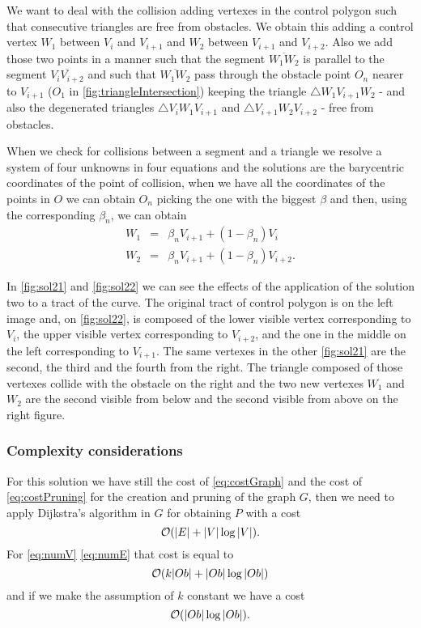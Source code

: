 \documentclass[dissertation.tex]{subfiles}
\begin{document}
We want to deal with the collision adding vertexes in the control
polygon such that consecutive triangles are free from obstacles. We
obtain this adding a control vertex $W_1$ between $V_i$ and $V_{i+1}$
and $W_2$ between $V_{i+1}$ and $V_{i+2}$. Also we add those two
points in a manner such that the segment $\overline{W_1W_2}$ is
parallel to the segment $\overline{V_iV_{i+2}}$ and such that
$\overline{W_1W_2}$ pass through the obstacle point $O_n$ nearer to
$V_{i+1}$ ($O_1$ in \cref{fig:triangleIntersection}) keeping the
triangle $\triangle W_1V_{i+1}W_2$ - and also
the degenerated triangles $\triangle V_iW_1V_{i+1}$ and $\triangle
V_{i+1}W_2V_{i+2}$ - free from obstacles.

When we check for collisions between a segment and a triangle we
resolve a system of four unknowns in
four equations and the solutions are the barycentric coordinates of
the point of collision, when we have all the coordinates of the points
in $O$ we can obtain $O_n$ picking the one with the biggest $\beta$
and then, using the corresponding $\beta_n$, we can obtain
\begin{eqnarray*}
  W_1&=&\beta_n V_{i+1}+(1-\beta_n)V_i\\
  W_2&=&\beta_n V_{i+1}+(1-\beta_n)V_{i+2}.
\end{eqnarray*}

In \cref{fig:sol21} and \cref{fig:sol22} we can see the effects of the
application of the
solution two to a tract of the curve. The original tract of control
polygon is on the left image and, on \cref{fig:sol22}, is composed of
the lower
visible vertex corresponding to $V_i$, the
upper visible vertex corresponding to $V_{i+2}$, and the one in
the middle on the left corresponding to $V_{i+1}$. The same vertexes
in the other \cref{fig:sol21} are the second, the third and the fourth
from the right. The triangle
composed of those vertexes
collide with the obstacle on the right and the two new vertexes $W_1$
and $W_2$ are the second visible from below and the second visible
from above on the right figure.

\subsubsection{Complexity considerations}
For this solution we have still the cost of \cref{eq:costGraph} and
the cost of \cref{eq:costPruning} for
the creation and pruning of the graph $G$, then we need to apply Dijkstra's
algorithm in $G$ for obtaining $P$ with a cost
\begin{equation*}
  \mathcal{O}(|E|+|V|\log |V|).
\end{equation*}
For \cref{eq:numV} \cref{eq:numE} that cost is equal to
\begin{equation*}
  \mathcal{O}(k|Ob|+|Ob|\log |Ob|)
\end{equation*}
and if we make the assumption of $k$ constant we have a cost
\begin{equation*}
  \mathcal{O}(|Ob|\log |Ob|).
\end{equation*}
\end{document}
